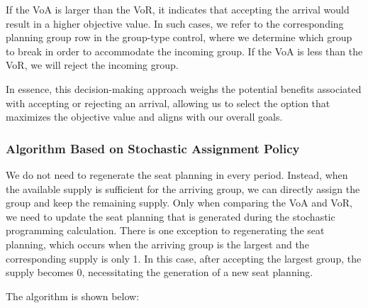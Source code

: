 If the VoA is larger than the VoR, it indicates that accepting the arrival would result in a higher objective value. In such cases, we refer to the corresponding planning group row in the group-type control, where we determine which group to break in order to accommodate the incoming group. If the VoA is less than the VoR, we will reject the incoming group.

In essence, this decision-making approach weighs the potential benefits associated with accepting or rejecting an arrival, allowing us to select the option that maximizes the objective value and aligns with our overall goals.


\subsubsection{Algorithm Based on Stochastic Assignment Policy}
We do not need to regenerate the seat planning in every period. Instead, when the available supply is sufficient for the arriving group, we can directly assign the group and keep the remaining supply. Only when comparing the VoA and VoR, we need to update the seat planning that is generated during the stochastic programming calculation. There is one exception to regenerating the seat planning, which occurs when the arriving group is the largest and the corresponding supply is only 1. In this case, after accepting the largest group, the supply becomes 0, necessitating the generation of a new seat planning.


The algorithm is shown below:

